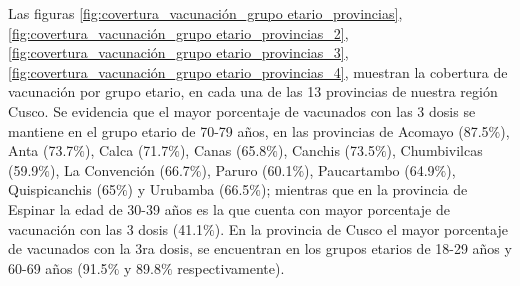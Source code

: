 \documentclass[12pt,a4paper,openany]{book}
\begin{document}
	
	Las figuras \ref{fig:covertura_vacunación_grupo etario_provincias}, \ref{fig:covertura_vacunación_grupo etario_provincias_2}, \ref{fig:covertura_vacunación_grupo etario_provincias_3}, \ref{fig:covertura_vacunación_grupo etario_provincias_4},
	muestran la cobertura de vacunación por grupo etario, en cada una de las 13 provincias de nuestra región Cusco. Se evidencia que el mayor porcentaje de vacunados con las 3 dosis se mantiene en el grupo etario de 70-79 años, en las provincias de Acomayo (87.5$\%$), Anta (73.7$\%$), Calca (71.7$\%$), Canas (65.8$\%$), Canchis (73.5$\%$), Chumbivilcas (59.9$\%$), La Convención (66.7$\%$), Paruro (60.1$\%$), Paucartambo (64.9$\%$), Quispicanchis (65$\%$) y Urubamba (66.5$\%$); mientras que en la provincia de Espinar la edad de 30-39 años es la que cuenta con mayor porcentaje de vacunación con las 3 dosis (41.1$\%$). En la provincia de Cusco el mayor porcentaje de vacunados con la 3ra dosis, se encuentran en los grupos etarios de 18-29 años y 60-69 años (91.5$\%$ y 89.8$\%$ respectivamente).
	
\end{document}
